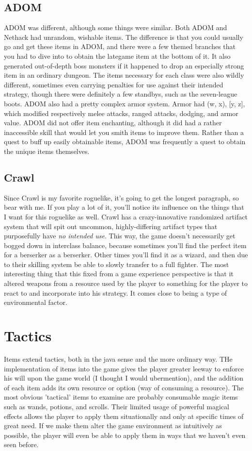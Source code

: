 \documentclass[a4paper,11pt]{article}
\begin{document}
\subsection{ADOM} ADOM was different, although some things were similar. Both ADOM and Nethack had unrandom, wishable items. The difference is that you could usually go and get these items in ADOM, and there were a few themed branches that you had to dive into to obtain the lategame item at the bottom of it. It also generated out-of-depth boss monsters if it happened to drop an especially strong item in an ordinary dungeon. The items necessary for each class were also wildly different, sometimes even carrying penalties for use against their intended strategy, though there were definitely a few standbys, such as the seven-league boots. ADOM also had a pretty complex armor system. Armor had (w, x), [y, z], which modified respectively melee attacks, ranged attacks, dodging, and armor value. ADOM did not offer item enchanting, although it did had a rather inaccessible skill that would let you smith items to improve them. Rather than a quest to buff up easily obtainable items, ADOM was frequently a quest to obtain the unique items themselves. 
\subsection{Crawl} Since Crawl is my favorite roguelike, it's going to get the longest paragraph, so bear with me. If you play a lot of it, you'll notice its influence on the things that I want for this roguelike as well. Crawl has a crazy-innovative randomized artifact system that will spit out uncommon, highly-differing artifact types that purposefully have \textit{no intended use}. This way, the game doesn't necessarily get bogged down in interclass balance, because sometimes you'll find the perfect item for a berserker as a berserker. Other times you'll find it as a wizard, and then due to their skilling system be able to slowly transfer to a full fighter. The most interesting thing that this fixed from a game experience perspective is that it altered weapons from a resource used by the player to something for the player to react to and incorporate into his strategy. It comes close to being a type of environmental factor.

\section{Tactics}
Items extend tactics, both in the java sense and the more ordinary way. THe implementation of items into the game gives the player greater leeway to enforce his will upon the game world (I thought I would ubermention), and the addition of each item adds its own resource or option (way of consuming a resource).  The most obvious 'tactical' items to examine are probably consumable magic items such as wands, potions, and scrolls. Their limited usage of powerful magical effects allows the player to apply them situationally and only at specific times of great need. If we make them alter the game environment as intuitively as possible, the player will even be able to apply them in ways that we haven't even seen before.
\end{document}
